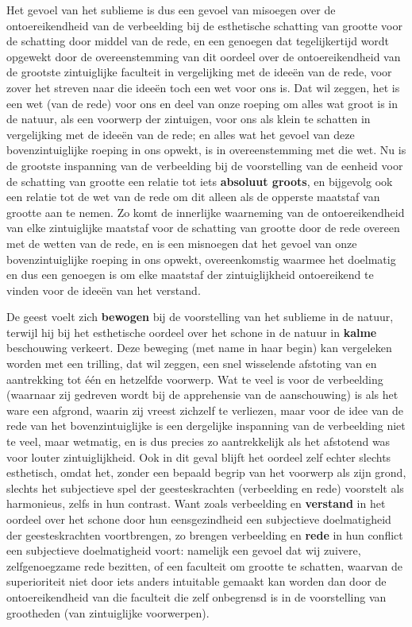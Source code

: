 Het gevoel van het sublieme is dus een gevoel van misoegen over de ontoereikendheid van de verbeelding bij de esthetische schatting van grootte voor de schatting door middel van de rede, en een genoegen dat tegelijkertijd wordt opgewekt door de overeenstemming van dit oordeel over de ontoereikendheid van de grootste zintuiglijke faculteit in vergelijking met de ideeën van de rede, voor zover het streven naar die ideeën toch een wet voor ons is. Dat wil zeggen, het is een wet (van de rede) voor ons en deel van onze roeping om alles wat groot is in de natuur, als een voorwerp der zintuigen, voor ons als klein te schatten in vergelijking met de ideeën van de rede; en alles wat het gevoel van deze bovenzintuiglijke roeping in ons opwekt, is in overeenstemming met die wet. Nu is de grootste inspanning van de verbeelding bij de voorstelling van de eenheid voor de schatting van grootte een relatie tot iets \textbf{absoluut groots}, en bijgevolg ook een relatie tot de wet van de rede om dit alleen als de opperste maatstaf van grootte aan te nemen. Zo komt de innerlijke waarneming van de ontoereikendheid van elke zintuiglijke maatstaf voor de schatting van grootte door de rede overeen met de wetten van de rede, en is een misnoegen dat het gevoel van onze bovenzintuiglijke roeping in ons opwekt, overeenkomstig waarmee het doelmatig en dus een genoegen is om elke maatstaf der zintuiglijkheid ontoereikend te vinden voor de ideeën van het verstand.

De geest voelt zich \textbf{bewogen} bij de voorstelling van het sublieme in de natuur, terwijl hij bij het esthetische oordeel over het schone in de natuur in \textbf{kalme} beschouwing verkeert. Deze beweging (met name in haar begin) kan vergeleken worden met een trilling, dat wil zeggen, een snel wisselende afstoting van en aantrekking tot één en hetzelfde voorwerp. Wat te veel is voor de verbeelding (waarnaar zij gedreven wordt bij de apprehensie van de aanschouwing) is als het ware een afgrond, waarin zij vreest zichzelf te verliezen, maar voor de idee van de rede van het bovenzintuiglijke is een dergelijke inspanning van de verbeelding niet te veel, maar wetmatig, en is dus precies zo aantrekkelijk als het afstotend was voor louter zintuiglijkheid. Ook in dit geval blijft het oordeel zelf echter slechts esthetisch, omdat het, zonder een bepaald begrip van het voorwerp als zijn grond, slechts het subjectieve spel der geesteskrachten (verbeelding en rede) voorstelt als harmonieus, zelfs in hun contrast. Want zoals verbeelding en \textbf{verstand} in het oordeel over het schone door hun eensgezindheid een subjectieve doelmatigheid der geesteskrachten voortbrengen, zo brengen verbeelding en \textbf{rede} in hun conflict een subjectieve doelmatigheid voort: namelijk een gevoel dat wij zuivere, zelfgenoegzame rede bezitten, of een faculteit om grootte te schatten, waarvan de superioriteit niet door iets anders intuitable gemaakt kan worden dan door de ontoereikendheid van die faculteit die zelf onbegrensd is in de voorstelling van grootheden (van zintuiglijke voorwerpen).

